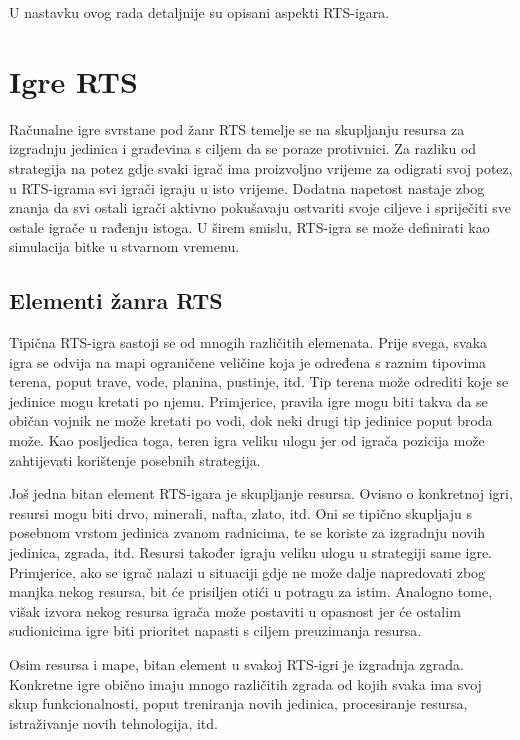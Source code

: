\documentclass[times, utf8, zavrsni, numeric]{fer}
\begin{document}
\par U nastavku ovog rada detaljnije su opisani aspekti RTS-igara.

\chapter{Igre RTS}\label{ch:rtsGames}

\par Računalne igre svrstane pod žanr RTS temelje se na skupljanju resursa za izgradnju jedinica i građevina s ciljem da se poraze protivnici. 
Za razliku od strategija na potez gdje svaki igrač ima proizvoljno vrijeme za odigrati svoj potez, u RTS-igrama svi igrači igraju u isto vrijeme.
Dodatna napetost nastaje zbog znanja da svi ostali igrači aktivno pokušavaju ostvariti svoje ciljeve i spriječiti sve ostale igrače u rađenju istoga.
U širem smislu, RTS-igra se može definirati kao simulacija bitke u stvarnom vremenu.

\section{Elementi žanra RTS}

\par Tipična RTS-igra sastoji se od mnogih različitih elemenata.
Prije svega, svaka igra se odvija na mapi ograničene veličine koja je određena s raznim tipovima terena, poput trave, vode, planina, pustinje, itd. 
Tip terena može odrediti koje se jedinice mogu kretati po njemu.
Primjerice, pravila igre mogu biti takva da se običan vojnik ne može kretati po vodi, dok neki drugi tip jedinice poput broda može.
Kao posljedica toga, teren igra veliku ulogu jer od igrača pozicija može zahtijevati korištenje posebnih strategija.

\par Još jedna bitan element RTS-igara je skupljanje resursa.
Ovisno o konkretnoj igri, resursi mogu biti drvo, minerali, nafta, zlato, itd. Oni se tipično skupljaju s posebnom vrstom jedinica zvanom radnicima, te se koriste za izgradnju novih jedinica, zgrada, itd.
Resursi također igraju veliku ulogu u strategiji same igre.
Primjerice, ako se igrač nalazi u situaciji gdje ne može dalje napredovati zbog manjka nekog resursa, bit će prisiljen otići u potragu za istim.
Analogno tome, višak izvora nekog resursa igrača može postaviti u opasnost jer će ostalim sudionicima igre biti prioritet napasti s ciljem preuzimanja resursa.

\par Osim resursa i mape, bitan element u svakoj RTS-igri je izgradnja zgrada. 
Konkretne igre obično imaju mnogo različitih zgrada od kojih svaka ima svoj skup funkcionalnosti, poput treniranja novih jedinica, procesiranje resursa, istraživanje novih tehnologija, itd.  
\end{document}
